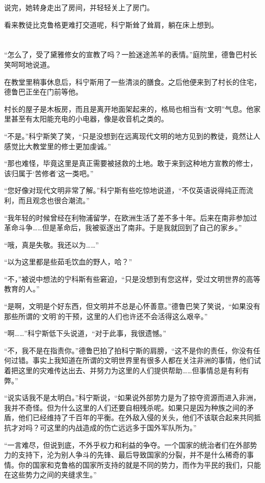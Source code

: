 说完，她转身走出了房间，并轻轻关上了房门。

看来教徒比克鲁格更难打交道呢，科宁斯耸了耸肩，躺在床上想到。

\section*{}

“怎么了，受了黛雅修女的宣教了吗？一脸迷途羔羊的表情。”庭院里，德鲁巴村长笑呵呵地说道。

在教堂里稍事休息后，科宁斯用了一些清淡的膳食。之后他便来到了村长的住宅，德鲁巴正坐在门前等他。

村长的屋子是木板房，而且是离开地面架起来的，格局也相当有“文明”气息。他家里甚至有太阳能充电的小电器，像是收音机之类的。

“不是。”科宁斯笑了笑，“只是没想到在远离现代文明的地方见到的教徒，竟然让人感觉比大教堂里的修士更加虔诚。”

“那也难怪，毕竟这里是真正需要被拯救的土地。敢于来到这种地方宣教的修士，该归属于‘苦修者’这一类吧。”

“您好像对现代文明非常了解。”科宁斯有些吃惊地说道，“不仅英语说得纯正而流利，而且观念也很合潮流。”

“我年轻的时候曾经在利物浦留学，在欧洲生活了差不多十年。后来在南非参加过革命斗争……但是革命后，我被驱逐出了南非。于是我就回到了自己的家乡。”

“哦，真是失敬。我还以为……”

“以为这里都是些茹毛饮血的野人，哈？”

“不，”被说中想法的宁科斯有些窘迫，“只是没想到有您这样，受过文明世界的高等教育的人。”

“是啊，文明是个好东西，但文明并不总是心怀善意。”德鲁巴笑了笑说，“如果没有那些所谓的‘文明’的干预，这里的人们也许还不会活得这么艰辛。”

“啊……”科宁斯低下头说道，“对于此事，我很遗憾。”

“不，我不是在指责你。”德鲁巴拍了拍科宁斯的肩膀，“这不是你的责任，你没有任何过错。事实上我知道在所谓的文明世界里有很多人都在关注非洲的事情，他们试着把这里的灾难传达出去、并努力为这里的人们提供帮助……但事情总是有利有弊。”

“说实话我不是太明白。”科宁斯说，“如果说外部势力是为了掠夺资源而进入非洲，我并不奇怪。但为什么这里的人们还要自相残杀呢。如果只是因为种族之间的矛盾，他们已经维持了千百年的平衡。在外敌入侵的关头，他们不该联合起来共同抵抗才对吗？可这里的内战造成的伤亡远远多于国外军队所为。”

“一言难尽，但说到底，不外乎权力和利益的争夺。一个国家的统治者们在外部势力的支持下，沦为别人争斗的先锋、最后导致国家的分裂，并不是什么稀奇的事情。你的国家和克鲁格的国家所支持的就是不同的势力，而作为平民的我们，只能在这些势力之间的夹缝求生。”

